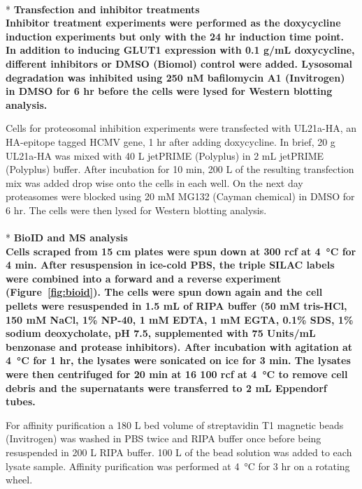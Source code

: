 \\*
\bfseries{Transfection and inhibitor treatments}\\
\normalfont Inhibitor treatment experiments were performed as the doxycycline induction experiments but only with the 24 hr induction time point. In addition to inducing GLUT1 expression with 0.1 \textmu g/mL doxycycline, different inhibitors or DMSO (Biomol) control were added. Lysosomal degradation was inhibited using 250 nM bafilomycin A1 (Invitrogen) in DMSO for 6 hr before the cells were lysed for Western blotting analysis.

Cells for proteosomal inhibition experiments were transfected with UL21a-HA, an HA-epitope tagged HCMV gene, 1 hr after adding doxycycline. In brief, 20 \textmu g UL21a-HA was mixed with 40 \textmu L jetPRIME (Polyplus) in 2 mL jetPRIME (Polyplus) buffer. After incubation for 10 min, 200 \textmu L of the resulting transfection mix was added drop wise onto the cells in each well. On the next day proteasomes were blocked using 20 mM MG132 (Cayman chemical) in DMSO for 6 hr. The cells were then lysed for Western blotting analysis.
\\
\\*
\bfseries{BioID and MS analysis}\\
\normalfont Cells scraped from 15 cm plates were spun down at 300 rcf at \SI{4}{\celsius} for 4 min. After resuspension in ice-cold PBS, the triple SILAC labels were combined into a forward and a reverse experiment (Figure~\ref{fig:bioid}). The cells were spun down again and the cell pellets were resuspended in 1.5 mL of RIPA buffer (50 mM tris-HCl, 150 mM NaCl, 1\% NP-40, 1 mM EDTA, 1 mM EGTA, 0.1\% SDS, 1\% sodium deoxycholate, pH 7.5, supplemented with 75 Units/mL benzonase and protease inhibitors). After incubation with agitation at \SI{4}{\celsius} for 1 hr, the lysates were sonicated on ice for 3 min. The lysates were then centrifuged for 20 min at 16 100 rcf at \SI{4}{\celsius} to remove cell debris and the supernatants were transferred to 2 mL Eppendorf tubes.

For affinity purification a 180 {}\textmu L bed volume of streptavidin T1 magnetic beads (Invitrogen) was washed in PBS twice and RIPA buffer once before being resuspended in 200 {}\textmu L RIPA buffer. 100 {}\textmu L of the bead solution was added to each lysate sample. Affinity purification was performed at \SI{4}{\celsius} for 3 hr on a rotating wheel.

